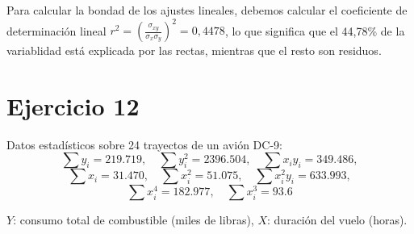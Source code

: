 \documentclass[a4paper,12pt]{article}
\begin{document}
Para calcular la bondad de los ajustes lineales, debemos calcular el coeficiente de determinación lineal $r^2=(\frac{\sigma_{xy}}{\sigma_x \sigma_y})^2 = 0,4478$, lo que significa que el 44,78\% de la variablidad está explicada por las rectas, mientras que el resto son residuos.

\section*{Ejercicio 12}
Datos estadísticos sobre 24 trayectos de un avión DC-9:
\[ \sum y_i = 219.719, \quad \sum y_i^2 = 2396.504, \quad \sum x_i y_i = 349.486, \]
\[ \sum x_i = 31.470, \quad \sum x_i^2 = 51.075, \quad \sum x_i^2 y_i = 633.993, \]
\[ \sum x_i^4 = 182.977, \quad \sum x_i^3 = 93.6 \]

$Y$: consumo total de combustible (miles de libras), $X$: duración del vuelo (horas).
\end{document}
